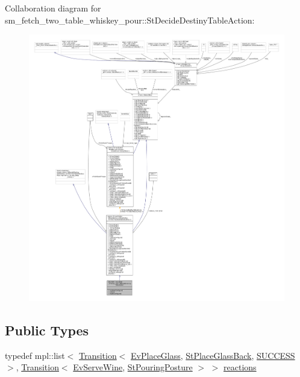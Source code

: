 Collaboration diagram for sm\+\_\+fetch\+\_\+two\+\_\+table\+\_\+whiskey\+\_\+pour\+:\+:St\+Decide\+Destiny\+Table\+Action\+:
\nopagebreak
\begin{figure}[H]
\begin{center}
\leavevmode
\includegraphics[width=350pt]{structsm__fetch__two__table__whiskey__pour_1_1StDecideDestinyTableAction__coll__graph}
\end{center}
\end{figure}
\subsection*{Public Types}
\begin{DoxyCompactItemize}
\item 
typedef mpl\+::list$<$ \hyperlink{classsmacc_1_1Transition}{Transition}$<$ \hyperlink{structsm__fetch__two__table__whiskey__pour_1_1EvPlaceGlass}{Ev\+Place\+Glass}, \hyperlink{structsm__fetch__two__table__whiskey__pour_1_1StPlaceGlassBack}{St\+Place\+Glass\+Back}, \hyperlink{structsmacc_1_1default__transition__tags_1_1SUCCESS}{S\+U\+C\+C\+E\+SS} $>$, \hyperlink{classsmacc_1_1Transition}{Transition}$<$ \hyperlink{structsm__fetch__two__table__whiskey__pour_1_1EvServeWine}{Ev\+Serve\+Wine}, \hyperlink{structsm__fetch__two__table__whiskey__pour_1_1StPouringPosture}{St\+Pouring\+Posture} $>$ $>$ \hyperlink{structsm__fetch__two__table__whiskey__pour_1_1StDecideDestinyTableAction_a34401c5a7f88b98f4d85e274dc26de4b}{reactions}
\end{DoxyCompactItemize}
